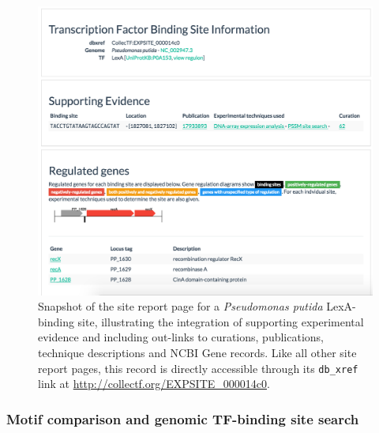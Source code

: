 \begin{figure}
  \centering
  \includegraphics[width=\textwidth]{figures/chapter2/individual-site}
  \caption[Snapshot of the site report page for a \textit{Pseudomonas putida}
  LexA-binding site.]{Snapshot of the site report page for a
    \textit{Pseudomonas putida} LexA-binding site, illustrating the integration
    of supporting experimental evidence and including out-links to curations,
    publications, technique descriptions and NCBI Gene records. Like all other
    site report pages, this record is directly accessible through its
    \texttt{db\_xref} link at \url{http://collectf.org/EXPSITE_000014c0}.}
\label{fig:individual-site}
\end{figure}

\subsubsection{Motif comparison and genomic TF-binding site search}

